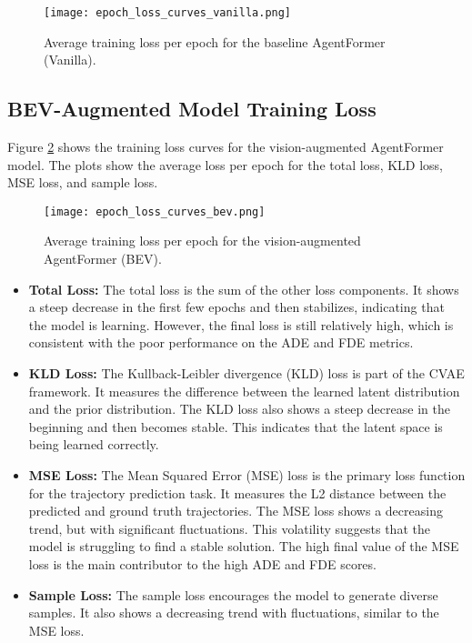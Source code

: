 \begin{figure}[h]
\centering
\texttt{[image: epoch\_loss\_curves\_vanilla.png]}
\caption{Average training loss per epoch for the baseline AgentFormer (Vanilla).}
\label{fig:loss_curves_vanilla}
\end{figure}

\subsection{BEV-Augmented Model Training Loss}

Figure \ref{fig:loss_curves_bev} shows the training loss curves for the vision-augmented AgentFormer model. The plots show the average loss per epoch for the total loss, KLD loss, MSE loss, and sample loss.

\begin{figure}[h]
\centering
\texttt{[image: epoch\_loss\_curves\_bev.png]}
\caption{Average training loss per epoch for the vision-augmented AgentFormer (BEV).}
\label{fig:loss_curves_bev}
\end{figure}

\begin{itemize}
    \item \textbf{Total Loss:} The total loss is the sum of the other loss components. It shows a steep decrease in the first few epochs and then stabilizes, indicating that the model is learning. However, the final loss is still relatively high, which is consistent with the poor performance on the ADE and FDE metrics.
    \item \textbf{KLD Loss:} The Kullback-Leibler divergence (KLD) loss is part of the CVAE framework. It measures the difference between the learned latent distribution and the prior distribution. The KLD loss also shows a steep decrease in the beginning and then becomes stable. This indicates that the latent space is being learned correctly.
    \item \textbf{MSE Loss:} The Mean Squared Error (MSE) loss is the primary loss function for the trajectory prediction task. It measures the L2 distance between the predicted and ground truth trajectories. The MSE loss shows a decreasing trend, but with significant fluctuations. This volatility suggests that the model is struggling to find a stable solution. The high final value of the MSE loss is the main contributor to the high ADE and FDE scores.
    \item \textbf{Sample Loss:} The sample loss encourages the model to generate diverse samples. It also shows a decreasing trend with fluctuations, similar to the MSE loss.
\end{itemize}

